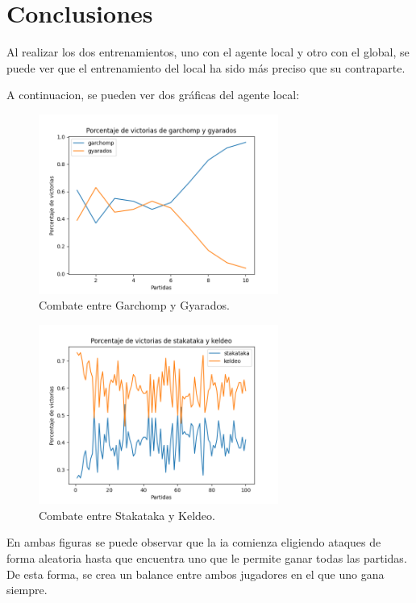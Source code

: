 \chapter{Conclusiones}

Al realizar los dos entrenamientos, uno con el agente local y otro con el global, se puede ver que el entrenamiento del local ha sido más preciso que su contraparte.

A continuacion, se pueden ver dos gráficas del agente local:
\begin{figure}[H]
    \centering
    \includegraphics[width=0.7\textwidth]{figures/garchomp-vs-gyarados.png}
    \caption{Combate entre Garchomp y Gyarados.}
    \label{fig:turn}
\end{figure}

\begin{figure}[H]
    \centering
    \includegraphics[width=0.7\textwidth]{figures/stakataka-vs-keldeo.png}
    \caption{Combate entre Stakataka y Keldeo.}
    \label{fig:turn}
\end{figure}

En ambas figuras se puede observar que la ia comienza eligiendo ataques de forma aleatoria hasta que encuentra uno que le permite ganar todas las partidas. De esta forma, se crea un balance entre ambos jugadores en el que uno gana siempre.

